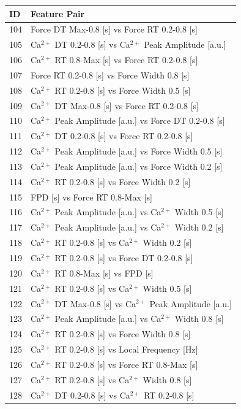 \documentclass{report}
\begin{document}
\begin{tabular}{@{}ll@{}}
\toprule
\textbf{ID} & \textbf{Feature Pair} \\
\midrule
104 & Force DT Max-0.8 [s] vs Force RT 0.2-0.8 [s] \\
105 & Ca$^{2+}$ DT 0.2-0.8 [s] vs Ca$^{2+}$ Peak Amplitude [a.u.] \\
106 & Ca$^{2+}$ RT 0.8-Max [s] vs Force RT 0.2-0.8 [s] \\
107 & Force RT 0.2-0.8 [s] vs Force Width 0.8 [s] \\
108 & Ca$^{2+}$ RT 0.2-0.8 [s] vs Force Width 0.5 [s] \\
109 & Ca$^{2+}$ DT Max-0.8 [s] vs Force RT 0.2-0.8 [s] \\
110 & Ca$^{2+}$ Peak Amplitude [a.u.] vs Force DT 0.2-0.8 [s] \\
111 & Ca$^{2+}$ DT 0.2-0.8 [s] vs Force RT 0.2-0.8 [s] \\
112 & Ca$^{2+}$ Peak Amplitude [a.u.] vs Force Width 0.5 [s] \\
113 & Ca$^{2+}$ Peak Amplitude [a.u.] vs Force Width 0.2 [s] \\
114 & Ca$^{2+}$ RT 0.2-0.8 [s] vs Force Width 0.2 [s] \\
115 & FPD [s] vs Force RT 0.8-Max [s] \\
116 & Ca$^{2+}$ Peak Amplitude [a.u.] vs Ca$^{2+}$ Width 0.5 [s] \\
117 & Ca$^{2+}$ Peak Amplitude [a.u.] vs Ca$^{2+}$ Width 0.2 [s] \\
118 & Ca$^{2+}$ RT 0.2-0.8 [s] vs Ca$^{2+}$ Width 0.2 [s] \\
119 & Ca$^{2+}$ RT 0.2-0.8 [s] vs Force DT 0.2-0.8 [s] \\
120 & Ca$^{2+}$ RT 0.8-Max [s] vs FPD [s] \\
121 & Ca$^{2+}$ RT 0.2-0.8 [s] vs Ca$^{2+}$ Width 0.5 [s] \\
122 & Ca$^{2+}$ DT Max-0.8 [s] vs Ca$^{2+}$ Peak Amplitude [a.u.] \\
123 & Ca$^{2+}$ Peak Amplitude [a.u.] vs Ca$^{2+}$ Width 0.8 [s] \\
124 & Ca$^{2+}$ RT 0.2-0.8 [s] vs Force Width 0.8 [s] \\
125 & Ca$^{2+}$ RT 0.2-0.8 [s] vs Local Frequency [Hz] \\
126 & Ca$^{2+}$ RT 0.2-0.8 [s] vs Force RT 0.8-Max [s] \\
127 & Ca$^{2+}$ RT 0.2-0.8 [s] vs Ca$^{2+}$ Width 0.8 [s] \\
128 & Ca$^{2+}$ DT 0.2-0.8 [s] vs Ca$^{2+}$ RT 0.2-0.8 [s] \\

\end{tabular}
\end{document}
